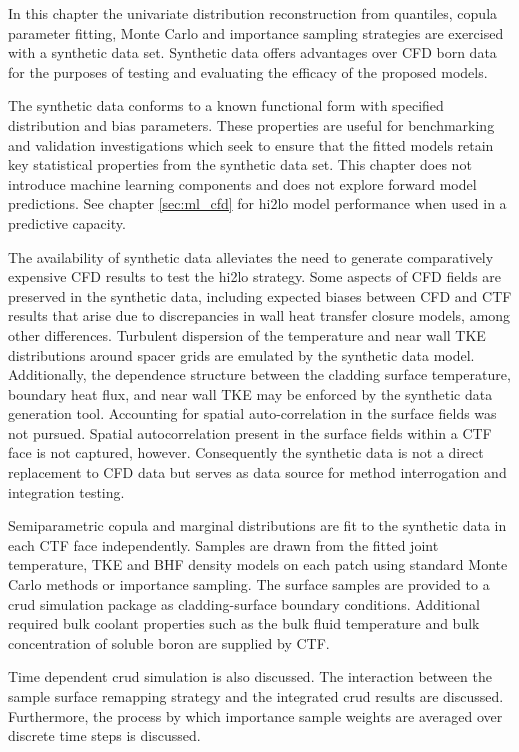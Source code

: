
In this chapter the univariate distribution reconstruction from quantiles, copula parameter fitting, Monte Carlo and importance sampling strategies are exercised with a synthetic data set.  Synthetic data offers advantages over CFD born data for the purposes of testing and evaluating the efficacy of the proposed models.  

The synthetic data conforms to a known functional form with specified distribution and bias parameters. These properties are useful for benchmarking and validation investigations which seek to ensure that the fitted models retain key statistical properties from the synthetic data set. This chapter does not introduce machine learning components and does not explore forward model predictions.  See chapter \ref{sec:ml_cfd} for hi2lo model performance when used in a predictive capacity.

The availability of synthetic data alleviates the need to generate comparatively expensive CFD results to test the hi2lo strategy.  Some aspects of CFD fields are preserved in the synthetic data, including expected biases between CFD and CTF results that arise due to discrepancies in wall heat transfer closure models, among other differences.  Turbulent dispersion of the temperature and near wall TKE distributions around spacer grids are emulated by the synthetic data model.  Additionally, the dependence structure between the cladding surface temperature, boundary heat flux, and near wall TKE may be enforced by the synthetic data generation tool.  Accounting for spatial auto-correlation in the surface fields was not pursued.  Spatial autocorrelation present in the surface fields within a CTF face is not captured, however.  Consequently the synthetic data is not a direct replacement to CFD data but serves as data source for method interrogation and integration testing.

Semiparametric copula and marginal distributions are fit to the synthetic data in each CTF face independently.  Samples are drawn from the fitted joint temperature, TKE and BHF density models on each patch using standard Monte Carlo methods or importance sampling.  The surface samples are provided to a crud simulation package as cladding-surface boundary conditions.  Additional required bulk coolant properties such as the bulk fluid temperature and bulk concentration of soluble boron are supplied by CTF.

Time dependent crud simulation is also discussed.  The interaction between the sample surface remapping strategy and the integrated crud results are discussed.  Furthermore, the process by which importance sample weights are averaged over discrete time steps is discussed.

